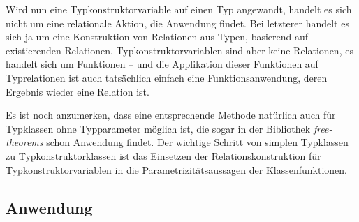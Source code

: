 
Wird nun eine Typkonstruktorvariable auf einen Typ angewandt, handelt es sich nicht um eine relationale Aktion, die Anwendung findet.
Bei letzterer handelt es sich ja um eine Konstruktion von Relationen aus Typen, basierend auf existierenden Relationen.
Typkonstruktorvariablen sind aber keine Relationen, es handelt sich um Funktionen -- und die Applikation dieser Funktionen auf
Typrelationen ist auch tatsächlich einfach eine Funktionsanwendung, deren Ergebnis wieder eine Relation ist.

Es ist noch anzumerken, dass eine entsprechende Methode natürlich auch für Typklassen ohne Typparameter möglich ist,
die sogar in der Bibliothek \textit{free-theorems} schon Anwendung findet. Der wichtige Schritt von simplen Typklassen
zu Typkonstruktorklassen ist das Einsetzen der Relationskonstruktion für Typkonstruktorvariablen in die Parametrizitätsaussagen
der Klassenfunktionen. 





\subsection{Anwendung}

